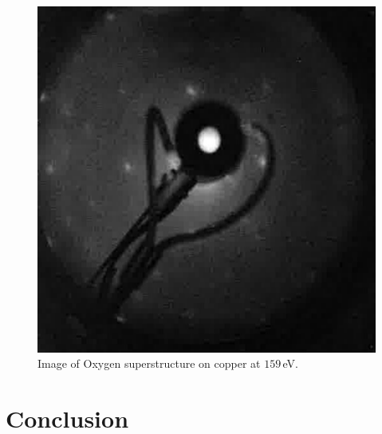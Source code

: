 \documentclass[a4paper,10pt]{scrartcl}
\begin{document}
\begin{figure}
\centering
\includegraphics[scale=0.45]{img/img_o2_159eV}
\caption{Image of Oxygen superstructure on copper at $159\,$eV. \label{fig:imgo2}}
\end{figure}


\section{Conclusion}
\end{document}
